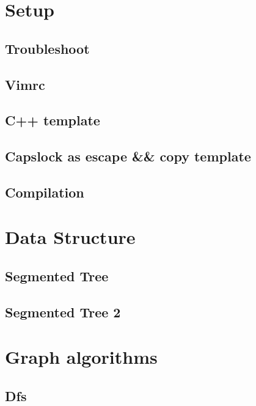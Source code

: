\section{Setup}
\subsection{Troubleshoot}
\raggedbottom
\hrulefill
\subsection{Vimrc}
\raggedbottom
\hrulefill
\subsection{C++ template}
\raggedbottom
\hrulefill
\subsection{Capslock as escape \&\& copy template}
\raggedbottom
\hrulefill
\subsection{Compilation}
\raggedbottom
\hrulefill


\section{Data Structure}
\subsection{Segmented Tree}
\raggedbottom
\hrulefill
\subsection{Segmented Tree 2}
\raggedbottom
\hrulefill

\section{Graph algorithms}
\subsection{Dfs}
\raggedbottom
\hrulefill
